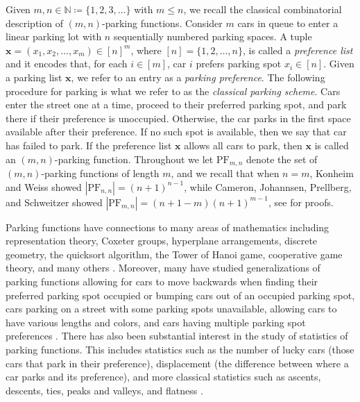 \documentclass[11pt,reqno]{BICA}
\theoremstyle{definition}
\newcommand{\PF}{\mathrm{PF}}
\newcommand{\x}{\mathbf{x}}
\begin{document}
Given $m,n\in\mathbb{N}\coloneqq\{1,2,3,\ldots\}$ with $m\leq n$, we recall the classical combinatorial description of $(m,n)$-parking functions.
Consider $m$ cars in queue to enter a linear parking lot with $n$ sequentially numbered parking spaces. 
A tuple $\x=(x_1,x_2,\ldots,x_m)\in[n]^m$, where $[n]=\{1,2,\ldots,n\}$, is called a \emph{preference list} and it encodes that, for each $i\in[m]$, car $i$ prefers parking spot $x_i\in[n]$. Given a parking list $\x$, we refer to an entry as a \emph{parking preference}. The following procedure for parking is what we refer to as the \emph{classical parking scheme}.
Cars enter the street one at a time, proceed to their preferred parking spot, and park there if their preference is unoccupied. Otherwise, the car parks in the first space available after their preference. 
If no such spot is available, then we say that car has failed to park.
If the preference list $\x$ allows all cars to park, then $\x$ is called an $(m,n)$-parking function. 
Throughout we let $\PF_{m,n}$ denote the set of $(m,n)$-parking functions of length $m$, and we recall that when $n=m$, Konheim and Weiss showed $|\PF_{n,n}|=(n+1)^{n-1}$, while Cameron, Johannsen, Prellberg, and Schweitzer showed $|\PF_{m,n}|=(n+1-m)(n+1)^{m-1}$, see \cites{defective,Konheim_Weiss} for proofs.


Parking functions have connections to many areas of mathematics including representation theory, Coxeter groups, hyperplane arrangements, discrete geometry, the quicksort algorithm, the Tower of Hanoi game, cooperative game theory, and many others \cites{ Hanoi,unit_perm,Boolean_intervals,parking_games,haimanConjecturesQuotientRing1994,quicksort}.
Moreover, many have studied 
generalizations of parking functions allowing for cars to move backwards when finding their preferred parking spot occupied or bumping cars out of an occupied parking spot, cars parking on a street with some parking spots unavailable, allowing cars to have various lengths and colors, and cars having multiple parking spot preferences \cites{joinsplit,ell_interval_pfs,unit_pf,assortments1,backwards,knaples,sequences,vacillating,assortments2,MVP}.
There has also been substantial interest in the study of
statistics of parking functions. This includes statistics such as the number of lucky cars (those cars that park in their preference), displacement (the difference between where a car parks and its preference), and more classical statistics such as ascents, descents, ties, peaks and valleys, and flatness \cites{pf_stats,FlatPF,GesselSeo}. 
\end{document}
